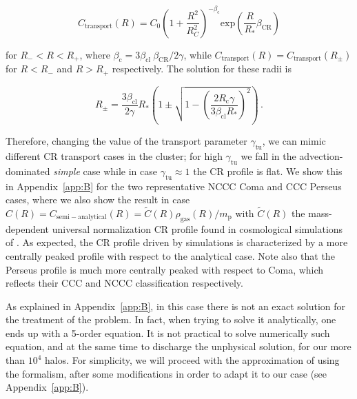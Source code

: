\documentclass[traditabstract]{aa}
\newcommand{\rmn}{\mathrm}
\begin{document}
\begin{appendix}
\begin{equation}
C_{\rmn{transport}}(R) = C_{0}\left( 1+ \frac{R^{2}}{R_{C}^{2}} \right)^{-\beta_{\rmn{c}}} \rmn{exp}\left( {\frac{R}{R_{*}}\beta_{\rmn{CR}}} \right)
\label{eq:Ctransport}
\end{equation} 

for $R_{-}<R<R_{+}$, where $\beta_{\rmn{c}}=3\beta_{\rmn{cl}}~\beta_{\rmn{CR}}/2\gamma$, while $C_{\rmn{transport}}(R) = C_{\rmn{transport}}(R_{\pm})$ for $R<R_{-}$ and $R>R_{+}$ respectively. The solution for these radii is

\begin{equation}
R_{\pm} = \frac{3\beta_{\rmn{cl}}}{2\gamma}R_{*}\left(1\pm\sqrt{1-\left(\frac{2R_{\rmn{c}}\gamma}{3\beta_{\rmn{cl}}R_{*}}\right)^{2}}\right) \, .
\label{eq:Rpm}
\end{equation} 

Therefore, changing the value of the transport parameter $\gamma_{\rmn{tu}}$, we can mimic different CR transport cases in the cluster; for high $\gamma_{\rmn{tu}}$ we fall in the advection-dominated \emph{simple} case while in case $\gamma_{\rmn{tu}}\approx1$ the CR profile is flat. We show this in Appendix~\ref{app:B} for the two representative NCCC Coma and CCC Perseus cases, where we also show the result in case $C(R)=C_{\rmn{semi-analytical}}(R)=\tilde{C}(R)\rho_{\rmn{gas}}(R)/m_{\rmn{p}}$ with $\tilde{C}(R)$ the mass-dependent universal normalization CR profile found in cosmological simulations of \cite{2010MNRAS.409..449P}. As expected, the CR profile driven by simulations is characterized by a more centrally peaked profile with respect to the analytical case. Note also that the Perseus profile is much more centrally peaked with respect to Coma, which reflects their CCC and NCCC classification respectively.


As explained in Appendix~\ref{app:B}, in this case there is not an
exact solution for the \cite{2011A&A...527A..99E} treatment of the problem. In
fact, when trying to solve it analytically, one ends up with a 5-order
equation. It is not practical to solve numerically such equation, and at the
same time to discharge the unphysical solution, for our more than $10^4$
halos. For simplicity, we will proceed with the approximation of using the
\cite{2011A&A...527A..99E} formalism, after some modifications in order to adapt
it to our case (see Appendix~\ref{app:B}). 



\end{appendix}
\end{document}
